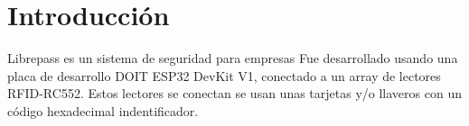 \documentclass[../informe_krapp.tex]{subfiles}
\begin{document}
\graphicspath{{../images/}}
\section{Introducción}
Librepass es un sistema de seguridad para empresas
Fue desarrollado usando una placa de desarrollo DOIT ESP32 DevKit V1, conectado
a un array de lectores RFID-RC552. Estos lectores se conectan  se usan unas
tarjetas y/o llaveros con un código hexadecimal indentificador.
\end{document}
